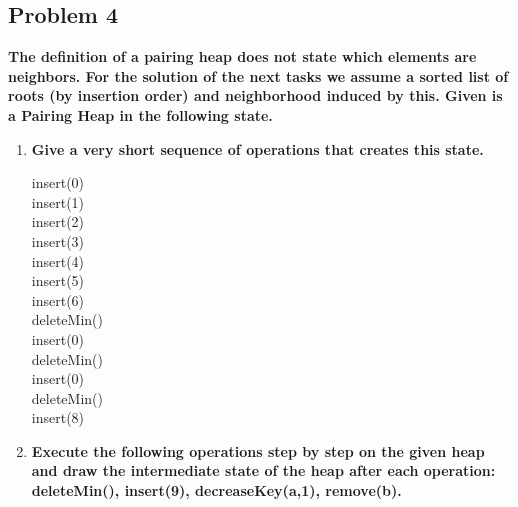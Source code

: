 \subsection{Problem 4}

\textbf{The definition of a pairing heap does not state which elements are neighbors. For the solution of the next tasks we assume a sorted list of roots (by insertion order) and neighborhood induced by this. Given is a Pairing Heap in the following state.}

\begin{enumerate}
    \item \textbf{Give a very short sequence of operations that creates this state.}
    
    insert(0) \\
    insert(1) \\
    insert(2) \\
    insert(3) \\
    insert(4) \\
    insert(5) \\
    insert(6) \\
    deleteMin() \\
    insert(0) \\
    deleteMin() \\
    insert(0) \\
    deleteMin() \\
    insert(8) 
    
    \item \textbf{Execute the following operations step by step on the given heap and draw the intermediate state of the heap after each operation: deleteMin(), insert(9), decreaseKey(a,1), remove(b).}

    \begin{center}
    \end{center}

\end{enumerate}